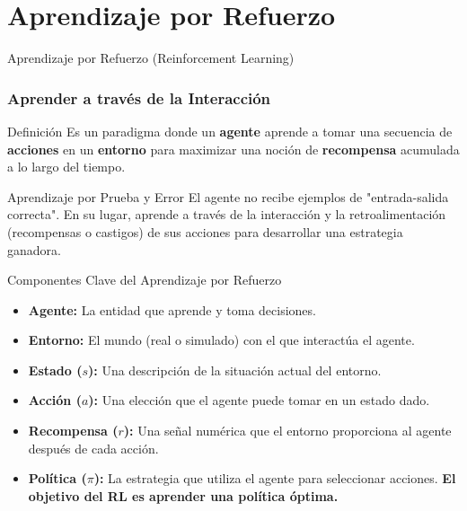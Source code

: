 \documentclass[aspectratio=169,xcolor=dvipsnames]{beamer}
\begin{document}
\section{Aprendizaje por Refuerzo}

\begin{frame}{Aprendizaje por Refuerzo (Reinforcement Learning)}
    \frametitle{Aprender a través de la Interacción}
    \begin{block}{Definición}
    Es un paradigma donde un \textbf{agente} aprende a tomar una secuencia de \textbf{acciones} en un \textbf{entorno} para maximizar una noción de \textbf{recompensa} acumulada a lo largo del tiempo.
    \end{block}
    
    \begin{alertblock}{Aprendizaje por Prueba y Error}
    El agente no recibe ejemplos de "entrada-salida correcta". En su lugar, aprende a través de la interacción y la retroalimentación (recompensas o castigos) de sus acciones para desarrollar una estrategia ganadora.
    \end{alertblock}
\end{frame}


\begin{frame}{Componentes Clave del Aprendizaje por Refuerzo}
    \begin{itemize}
        \item \textbf{Agente:} La entidad que aprende y toma decisiones. \pause
        \item \textbf{Entorno:} El mundo (real o simulado) con el que interactúa el agente. \pause
        \item \textbf{Estado ($s$):} Una descripción de la situación actual del entorno. \pause
        \item \textbf{Acción ($a$):} Una elección que el agente puede tomar en un estado dado. \pause
        \item \textbf{Recompensa ($r$):} Una señal numérica que el entorno proporciona al agente después de cada acción. \pause
        \item \textbf{Política ($\pi$):} La estrategia que utiliza el agente para seleccionar acciones. \textbf{El objetivo del RL es aprender una política óptima.}
    \end{itemize}
\end{frame}
\end{document}
